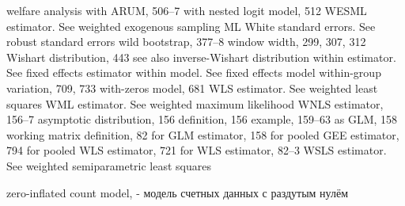 welfare analysis
with ARUM, 506–7
with nested logit model, 512
WESML estimator. See weighted exogenous sampling ML
White standard errors. See robust standard errors wild bootstrap, 377–8
window width, 299, 307, 312
Wishart distribution, 443
see also inverse-Wishart distribution
within estimator. See fixed effects estimator
within model. See fixed effects model
within-group variation, 709, 733
with-zeros model, 681
WLS estimator. See weighted least squares
WML estimator. See weighted maximum likelihood WNLS estimator, 156–7
asymptotic distribution, 156 definition, 156
example, 159–63
as GLM, 158
working matrix
definition, 82
for GLM estimator, 158
for pooled GEE estimator, 794 for pooled WLS estimator, 721 for WLS estimator, 82–3
WSLS estimator. See weighted semiparametric least squares

zero-inflated count model, - модель счетных данных с раздутым нулём

